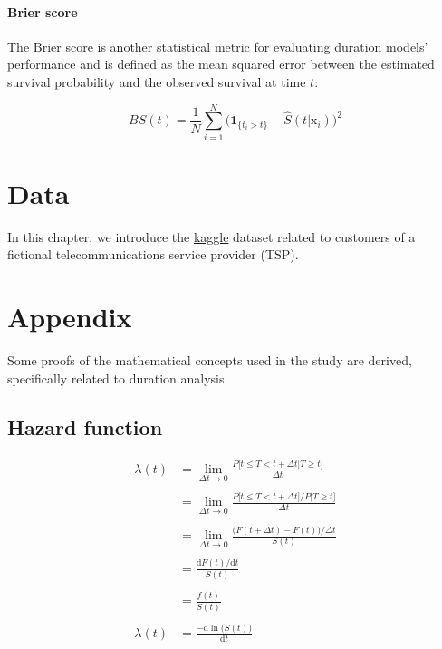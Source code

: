 \documentclass[
]{book}
\begin{document}
\hypertarget{brier-score}{%
\subsubsection*{Brier score}\label{brier-score}}

The Brier score is another statistical metric for evaluating duration models' performance and is defined as the mean squared error between the estimated survival probability and the observed survival at time \(t\):

\begin{equation}
  BS(t) = \frac{1}{N} \sum_{i=1}^{N} \Big(\pmb{1}_{\{t_i>t\}} - \hat{S}(t|\mathrm{x}_i) \Big)^2
  \label{eq:brier}
\end{equation}

\hypertarget{data}{%
\chapter{Data}\label{data}}

In this chapter, we introduce the \href{https://www.kaggle.com/yeanzc/telco-customer-churn-ibm-dataset}{kaggle} dataset related to customers of a fictional telecommunications service provider (TSP).

\hypertarget{appendix}{%
\chapter*{Appendix}\label{appendix}}

Some proofs of the mathematical concepts used in the study are derived, specifically related to duration analysis.

\hypertarget{hazard-function}{%
\section*{Hazard function}\label{hazard-function}}

\begin{equation}    
  \begin{aligned}
  \lambda(t) & = \lim_{\Delta t \to 0} \frac{P\big[t \leq T < t + \Delta t | T \geq t \big]}{\Delta t} \\\\
  & = \lim_{\Delta t \to 0} \frac{P\big[t \leq T < t + \Delta t \big] / P\big[T \geq t  \big]}{\Delta t} \\\\
  & = \lim_{\Delta t \to 0} \frac{\big(F(t+\Delta t)-F(t)\big) / \Delta t}{S(t)} \\\\
  & = \frac{\text{d} F(t) / \text{d} t}{S(t)} \\\\
  & = \frac{f(t)}{S(t)} \\\\
  \lambda(t) & = \frac{-\text{d} \ln \big(S(t)\big)}{\text{d} t}
  \end{aligned}
  \label{eq:hazfunproof}
\end{equation}
\end{document}
